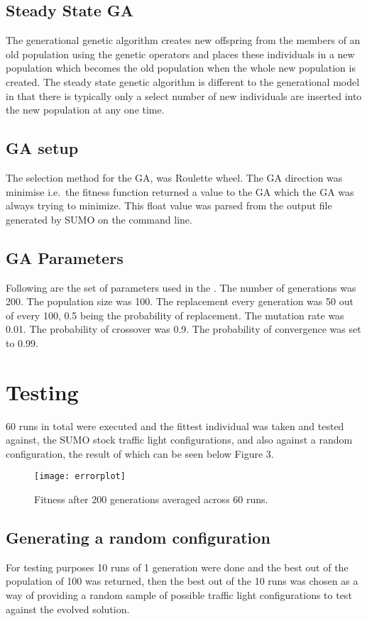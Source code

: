 \documentclass[a4paper,10pt]{article}
\begin{document}
\subsection{Steady State GA}
The generational genetic algorithm creates new offspring from the members of an old population using the genetic operators and places 
these individuals in a new population which becomes the old population when the whole new population is created. The steady
state genetic algorithm is different to the generational model in that there is typically only a select number of new individuals are
inserted into the new population at any one time.

\subsection{GA setup}
The selection method for the GA, was Roulette wheel. The GA direction was minimise i.e.\ the fitness function returned a value to the GA 
which the GA was always trying to minimize. This float value was parsed from the output file generated by SUMO on the command line.

\subsection{GA Parameters}
Following are the set of parameters used in the \@GA. The number of generations was 200. The population size was 100. The replacement 
every generation was 50 out of every 100, 0.5 being the probability of replacement. The mutation rate was 0.01. The probability of 
crossover was 0.9. The probability of convergence was set to 0.99.

\section{Testing}
60 runs in total were executed and the fittest individual was taken and tested against, the SUMO stock traffic light configurations, 
and also against a random configuration, the result of which can be seen below Figure 3.

\begin{figure}[h!]
  \caption{Fitness after 200 generations averaged across 60 runs.}
  \centering
    \texttt{[image: errorplot]}
\end{figure}

\subsection{Generating a random configuration} 
For testing purposes 10 runs of 1 generation were done and the best out of the population of 100 was returned, then the best out of the
10 runs was chosen as a way of providing a random sample of possible traffic light configurations to test against the evolved solution.
	
\end{document}
